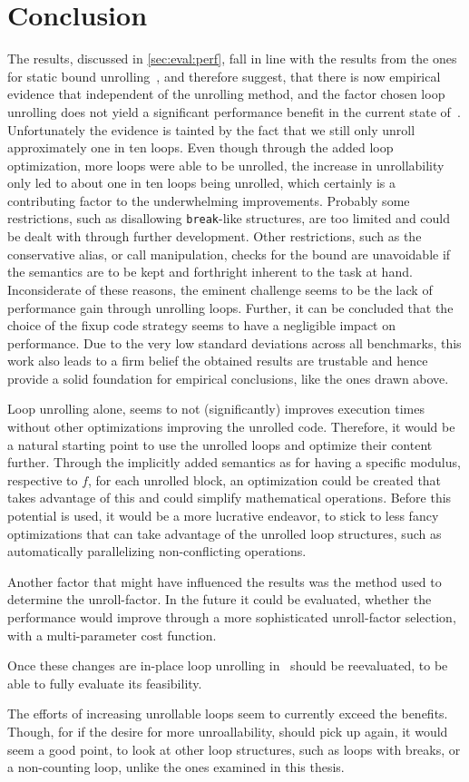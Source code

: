 \chapter{Conclusion}\label{sec:conclusion}

The results, discussed in \cref{sec:eval:perf}, fall in line with the results from the ones for static bound unrolling~\cite{aebi18bachelorarbeit}, and therefore suggest, that there is now empirical evidence that independent of the unrolling method, and the factor chosen loop unrolling does not yield a significant performance benefit in the current state of~\libFIRM.
Unfortunately the evidence is tainted by the fact that we still only unroll approximately one in ten loops.
Even though through the added loop optimization, more loops were able to be unrolled, the increase in unrollability only led to about one in ten loops being unrolled, which certainly is a contributing factor to the underwhelming improvements.
Probably some restrictions, such as disallowing \texttt{break}-like structures, are too limited and could be dealt with through further development.
Other restrictions, such as the conservative alias, or call manipulation, checks for the bound are unavoidable if the semantics are to be kept and forthright inherent to the task at hand.
Inconsiderate of these reasons, the eminent challenge seems to be the lack of performance gain through unrolling loops.
Further, it can be concluded that the choice of the fixup code strategy seems to have a negligible impact on performance.
Due to the very low standard deviations across all benchmarks, this work also leads to a firm belief the obtained results are trustable and hence provide a solid foundation for empirical conclusions, like the ones drawn above.

Loop unrolling alone, seems to not (significantly) improves execution times without other optimizations improving the unrolled code.
Therefore, it would be a natural starting point to use the unrolled loops and optimize their content further.
Through the implicitly added semantics as for having a specific modulus, respective to $f$, for each unrolled block, an optimization could be created that takes advantage of this and could simplify mathematical operations.
Before this potential is used, it would be a more lucrative endeavor, to stick to less fancy optimizations that can take advantage of the unrolled loop structures, such as automatically parallelizing non-conflicting operations.

Another factor that might have influenced the results was the method used to determine the unroll-factor.
In the future it could be evaluated, whether the performance would improve through a more sophisticated unroll-factor selection, with a multi-parameter cost function.

Once these changes are in-place loop unrolling in~\libFIRM{} should be reevaluated, to be able to fully evaluate its feasibility.

The efforts of increasing unrollable loops seem to currently exceed the benefits.
Though, for if the desire for more unroallability, should pick up again, it would seem a good point, to look at other loop structures, such as loops with breaks, or a non-counting loop, unlike the ones examined in this thesis.
